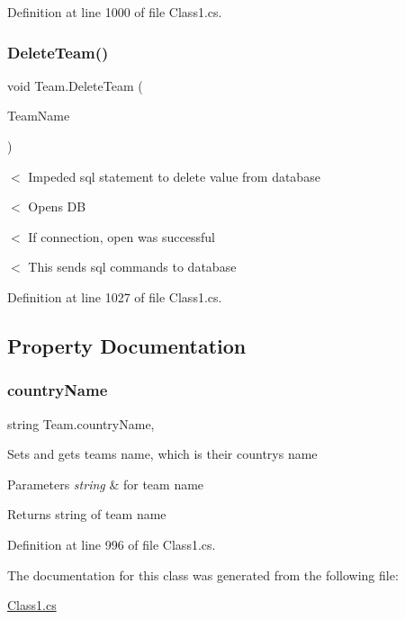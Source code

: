 Definition at line 1000 of file Class1.\+cs.

\mbox{\label{classTeam_a6b2ab2e650439bf7b915b3423cf5787f}} 
\subsubsection{\texorpdfstring{Delete\+Team()}{DeleteTeam()}}
{\footnotesize\ttfamily void Team.\+Delete\+Team (\begin{DoxyParamCaption}\item[{string}]{Team\+Name }\end{DoxyParamCaption})\hspace{0.3cm}{\ttfamily [inline]}}

$<$ Impeded sql statement to delete value from database

$<$ Opens DB

$<$ If connection, open was successful

$<$ This sends sql commands to database 

Definition at line 1027 of file Class1.\+cs.



\subsection{Property Documentation}
\mbox{\label{classTeam_abe0a9396e60ebf155cf10c0700214753}} 
\subsubsection{\texorpdfstring{country\+Name}{countryName}}
{\footnotesize\ttfamily string Team.\+country\+Name\hspace{0.3cm}{\ttfamily [get]}, {\ttfamily [set]}}

Sets and gets team\textquotesingle{}s name, which is their country\textquotesingle{}s name 
\begin{DoxyParams}{Parameters}
{\em string} & for team name \\
\hline
\end{DoxyParams}
\begin{DoxyReturn}{Returns}
string of team name 
\end{DoxyReturn}


Definition at line 996 of file Class1.\+cs.



The documentation for this class was generated from the following file\+:\begin{DoxyCompactItemize}
\item 
\hyperlink{Class1_8cs}{Class1.\+cs}\end{DoxyCompactItemize}
